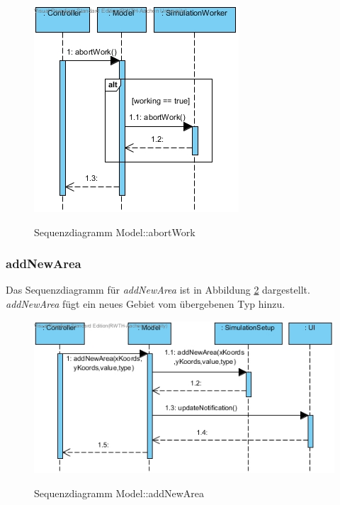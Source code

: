 \begin{figure}[H]
	\centering
	\includegraphics[scale=.85]{Bilder/Model__abortWork().jpg}\\
	\caption{Sequenzdiagramm Model::abortWork}
	\label{Sequenzdiagramm Model::abortWork}
\end{figure}

\subsubsection*{addNewArea}

Das Sequenzdiagramm für \emph{addNewArea} ist in Abbildung \ref{Sequenzdiagramm Model::addNewArea} dargestellt. \emph{addNewArea} fügt ein neues Gebiet vom übergebenen Typ hinzu.

\begin{figure}[H]
	\centering
	\includegraphics[scale=.85]{Bilder/Model__addNewArea().jpg}\\
	\caption{Sequenzdiagramm Model::addNewArea}
	\label{Sequenzdiagramm Model::addNewArea}
\end{figure}

